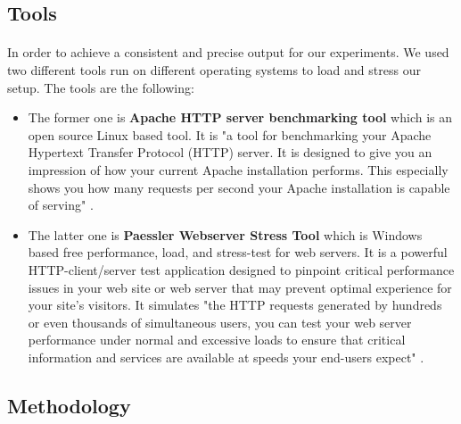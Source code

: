 \subsection{Tools}
\paragraph{}
In order to achieve a consistent and precise output for our experiments. We used two different tools run on different operating systems to load and stress our setup. The tools are the following: 

\begin{itemize}
\item The former one is \textbf{Apache HTTP server benchmarking tool} which is an open source Linux based tool. It is "a tool for benchmarking your Apache Hypertext Transfer Protocol (HTTP) server. It is designed to give you an impression of how your current Apache installation performs. This especially shows you how many requests per second your Apache installation is capable of serving" \cite{ab}. 

\item The latter one is \textbf{Paessler Webserver Stress Tool} which is Windows based free performance, load, and stress-test for web servers. It is a powerful HTTP-client/server test application designed to pinpoint critical performance issues in your web site or web server that may prevent optimal experience for your site's visitors. It  simulates "the HTTP requests generated by hundreds or even thousands of simultaneous users, you can test your web server performance under normal and excessive loads to ensure that critical information and services are available at speeds your end-users expect" \cite{paessler}.
\end{itemize}

\subsection{Methodology}
